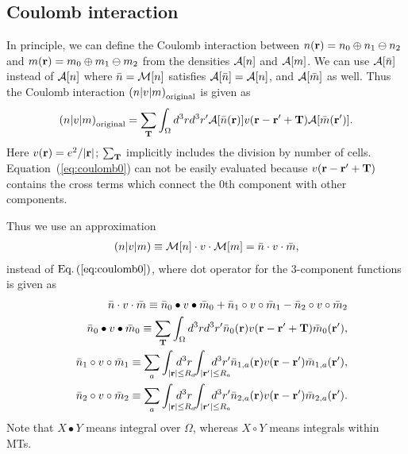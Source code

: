 \documentclass[a4paper,10pt,aip,onecolumn,amsmath,amssymb,floatfix,rmp]{revtex4-1}
\newcommand{\bfr}{{\bf r}}
\newcommand{\bfT}{{\bf T}}
\newcommand{\ooplus}{\oplus}
\newcommand{\oominus}{\ominus}
\def\calR{{\cal A}}
\newcommand{\req}[1]{\mbox{Eq.~\!(\ref{#1})}}
\def\MM{{\cal M}}
\def\inta{\int_{|\bfr|\leq R_a}\!\!\!\!\!\!\!\!\!\!\!\!}
\def\intad{\int_{|\bfr'|\leq R_a}\!\!\!\!\!\!\!\!\!\!\!\!}
\begin{document}
\subsection{Coulomb interaction}
\label{sec:coulomb} In principle, we can define the Coulomb interaction
between $n(\bfr)=n_0\ooplus n_1 \oominus n_2$ and $m(\bfr)=m_0 \ooplus
m_1 \oominus m_2$ from the densities $\calR[n]$ and $\calR[m]$.  We can
use $\calR[\bar{n}]$ instead of $\calR[n]$ where $\bar{n}=\MM[n]$
satisfies $\calR[\bar{n}]=\calR[n]$, and $\calR[\bar{m}]$ as well.  Thus
the Coulomb interaction $\left(n|v|m\right)_{\rm original}$ is given as
\begin{eqnarray}
\left(n|v|m\right)_{\rm original}=\sum_{\bfT} \int_\Omega d^3r d^3r' 
\calR[\bar{n}(\bfr)] v(\bfr-\bfr'+\bfT) \calR[\bar{m}(\bfr')].
\label{eq:coulomb0}
\end{eqnarray}
Here $v(\bfr)=e^2/|\bfr|$; $\sum_{\bfT}$ implicitly includes the
division by number of cells. Equation~(\ref{eq:coulomb0}) can not be
easily evaluated because $v(\bfr-\bfr'+\bfT)$ contains the cross terms
which connect the 0th component with other components.

Thus we use an approximation 
\begin{eqnarray}
\left(n|v|m\right)\equiv\MM[n] \cdot v \cdot \MM[m] = \bar{n} \cdot v \cdot \bar{m}, \label{eq:coulomb}
\end{eqnarray}
instead of $\req{eq:coulomb0}$, where dot operator for the 3-component
functions is given as
\begin{eqnarray}
&&\bar{n} \cdot v \cdot \bar{m} \equiv
\bar{n}_0 \bullet v \bullet \bar{m}_0 + \bar{n}_{1} \circ v \circ
\bar{m}_{1} - \bar{n}_{2} \circ v \circ \bar{m}_{2}\\
&&\bar{n}_0 \bullet v \bullet \bar{m}_0 \equiv \sum_{\bfT} \int_\Omega d^3r d^3r' \bar{n}_0(\bfr)v(\bfr-\bfr'+\bfT) \bar{m}_0(\bfr'), \label{eq:n0vn0}\\
&&\bar{n}_1 \circ v \circ \bar{m}_1 \equiv 
\sum_a \inta d^3r \intad d^3r' \bar{n}_{1,a}(\bfr)v(\bfr-\bfr') \bar{m}_{1,a}(\bfr'), \label{eq:n1vn1}\\
&&\bar{n}_2 \circ v \circ \bar{m}_2 \equiv \sum_a \inta d^3r \intad d^3r' \bar{n}_{2,a}(\bfr)v(\bfr-\bfr') \bar{m}_{2,a}(\bfr'). \label{eq:n2vn2}
\end{eqnarray}
Note that $X \bullet Y$ means integral over $\Omega$, whereas $X \circ
Y$ means integrals within MTs.
\end{document}
